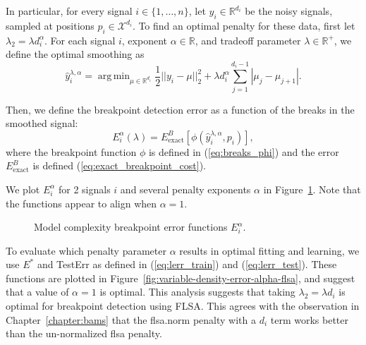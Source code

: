 \documentclass{jsfds} %
\newcommand{\fig}[3][H]{
  \begin{figure}[#1]
    \hskip -1cm
    
    \caption{#3}
    \label{fig:#2}
  \end{figure}
}
\DeclareMathOperator*{\argmin}{arg\,min}
\newcommand{\RR}{\mathbb{R}}
\begin{document}
\newpage

In particular, for every signal $i\in\{1,\dots,n\}$, let
$y_i\in\RR^{d_i}$ be the noisy signals, sampled at positions
$p_i\in\mathcal X^{d_i}$. To find an optimal penalty for these data,
first let $\lambda_2 = \lambda d_i^\alpha$. For each signal $i$,
exponent $\alpha\in\RR$, and tradeoff parameter $\lambda\in\RR^+$, we
define the optimal smoothing as
\begin{equation}
  \label{eq:flsa_lambda}
  \hat y^{\lambda,\alpha}_i = 
\argmin_{\mu\in\RR^{d_i}} 
\frac 1 2 ||y_i-\mu||_2^2
+\lambda d_i^\alpha \sum_{j=1}^{d_i-1} |\mu_j - \mu_{j+1}|.
\end{equation}

Then, we define the breakpoint detection error as a function of the
breaks in the smoothed signal:
\begin{equation}
  \label{eq:flsa_e_i_alpha}
  E_i^\alpha(\lambda) = 
E^B_{\text{exact}}
\left[
\phi\left(
\hat y^{\lambda,\alpha}_i,p_i
\right)
\right],
\end{equation}
where the breakpoint function $\phi$ is defined in
(\ref{eq:breaks_phi}) and the error $E_{\text{exact}}^B$ is defined
(\ref{eq:exact_breakpoint_cost}).

We plot $E_i^\alpha$ for 2 signals $i$ and several penalty exponents
$\alpha$ in Figure~\ref{fig:variable-density-berr-flsa}. Note that the
functions appear to align when $\alpha=1$.

\fig{variable-density-berr-flsa}{Model complexity breakpoint error
  functions $E_i^\alpha$.}

\newpage

To evaluate which penalty parameter $\alpha$ results in optimal
fitting and learning, we use $E^*$ and TestErr as defined in
(\ref{eq:lerr_train}) and (\ref{eq:lerr_test}). These functions
are plotted in Figure~\ref{fig:variable-density-error-alpha-flsa}, and
suggest that a value of $\alpha=1$ is optimal.  This analysis suggests
that taking $\lambda_2=\lambda d_i$ is optimal for breakpoint
detection using FLSA. This agrees with the observation in
Chapter~\ref{chapter:bams} that the flsa.norm penalty with a $d_i$
term works better than the un-normalized flsa penalty.
\end{document}
